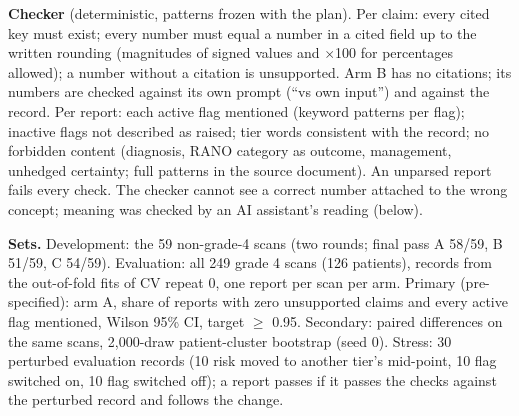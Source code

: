 \documentclass[11pt,a4paper]{article}
\begin{document}
\textbf{Checker} (deterministic, patterns frozen with the plan). Per claim: every cited key must exist; every number
must equal a number in a cited field up to the written rounding (magnitudes of signed values and $\times$100 for
percentages allowed); a number without a citation is unsupported. Arm B has no citations; its numbers are checked
against its own prompt (``vs own input'') and against the record. Per report: each active flag mentioned (keyword
patterns per flag); inactive flags not described as raised; tier words consistent with the record; no forbidden
content (diagnosis, RANO category as outcome, management, unhedged certainty; full patterns in the source
document). An unparsed report fails every check. The checker cannot see a correct number attached to the wrong
concept; meaning was checked by an AI assistant's reading (below).

\textbf{Sets.} Development: the 59 non-grade-4 scans (two rounds; final pass A 58/59, B 51/59, C 54/59).
Evaluation: all 249 grade 4 scans (126 patients), records from the out-of-fold fits of CV repeat 0, one report per
scan per arm. Primary (pre-specified): arm A, share of reports with zero unsupported claims and every active flag
mentioned, Wilson 95\% CI, target $\geq$ 0.95. Secondary: paired differences on the same scans, 2,000-draw
patient-cluster bootstrap (seed 0). Stress: 30 perturbed evaluation records (10 risk moved to another tier's
mid-point, 10 flag switched on, 10 flag switched off); a report passes if it passes the checks against the
perturbed record and follows the change.
\end{document}
